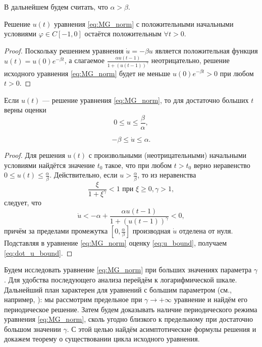 В дальнейшем будем считать, что $\alpha > \beta$.

\begin{proposition}
Решение $u(t)$ уравнения \eqref{eq:MG_norm} с положительными начальными условиями $\varphi \in C[-1, 0]$ остаётся положительным $\forall t > 0$.
\end{proposition}
\begin{proof}
	Поскольку решением уравнения $\dot{u} = -\beta u$ является положительная функция $u(t) = u(0) e^{-\beta t}$, а слагаемое $\frac{\alpha u(t-1)}{1+(u(t-1))^\gamma}$ неотрицательно, решение исходного уравнения \eqref{eq:MG_norm} будет не меньше $u(0) e^{-\beta t} > 0$ при любом $t > 0$.
\end{proof}

\begin{proposition}
	\label{prop:boundness}
	Если $u(t)$ --- решение уравнения \eqref{eq:MG_norm}, то для достаточно больших $t$ верны оценки
	\begin{equation}
		\label{eq:u_bound}
		0 \leq u \leq \frac{\beta}{\alpha},
	\end{equation}
	
	\begin{equation}
		\label{eq:dot_u_bound}
		-\beta \leq \dot{u} \leq \alpha.
	\end{equation}
\end{proposition}
\begin{proof}
	Для решения $u(t)$ с произвольными (неотрицательными) начальными условиями найдётся значение $t_0$ такое, что при любом $t > t_0$ верно неравенство $0 \leq u(t) \leq \frac{\alpha}{\beta}$. Действительно, если $u > \frac{\alpha}{\beta}$, то из неравенства
	\[
	\dfrac{\xi}{1 + \xi^{\gamma}} < 1 \text{ при } \xi \geq 0, \gamma > 1,
	\]
	следует, что
	\[\dot{u} < -\alpha + \frac{\alpha u(t - 1)}{1 + (u(t - 1))^{\gamma}} < 0,\]
	причём за пределами промежутка $[0, \frac{\alpha}{\beta}]$ производная $\dot{u}$ отделена от нуля. Подставляя в уравнение \eqref{eq:MG_norm} оценку \eqref{eq:u_bound}, получаем \eqref{eq:dot_u_bound}.
\end{proof}

Будем исследовать уравнение \eqref{eq:MG_norm} при больших значениях параметра $\gamma$. Для удобства последующего анализа перейдём к логарифмической шкале. Дальнейший план характерен для уравнений с большим параметром (см., например, \cite{Kolesov2010}): мы рассмотрим предельное при $\gamma\to+\infty$ уравнение и найдём его периодическое решение. Затем будем доказывать наличие периодического режима уравнения \eqref{eq:MG_norm}, сколь угодно близкого к предельному при достаточно большом значении $\gamma$. С этой целью найдём асимптотические формулы решения и докажем теорему о существовании цикла исходного уравнения.

